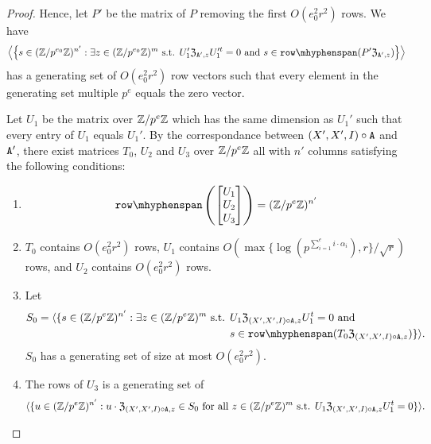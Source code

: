 \begin{proof}
Hence, let $P'$ be the matrix of $P$ removing the first $O(e_0^2 r^2)$ rows. 
We have \[\left\langle \left\{ s \in (\Z / p^{e_0}\Z)^{n'} : \exists z \in (\Z / p^{e_0} \Z)^m \text{ s.t. } U_{1}' \mathfrak{Z}_{\tA', z} U_{1}'^t = 0 \text{ and } s \in \rowspan(P'  \mathfrak{Z}_{\tA', z}) \right\} \right\rangle\] has a generating set of $O(e_0^2 r^2)$ row vectors such that every element in the generating set multiple $p^e$ equals the zero vector. 


Let $U_{1}$ be the matrix over $\mathbb{Z} / p^e \mathbb{Z}$ which has the same dimension as $U_{1}'$ such that every entry of $U_{1}$ equals $U_{1}'$.
By the correspondance between $(X', X', I) \circ \mathtt{A}$ and $\mathtt{A}'$,  
there exist matrices $T_0$,
$U_{2}$ and $U_3$ over $\mathbb{Z} / p^e \mathbb{Z}$ all with $n'$ columns satisfying the following conditions:
\begin{enumerate}
\item \[\rowspan\left(\begin{bmatrix} U_{1} \\ U_{2} \\ U_3 \end{bmatrix}\right) = (\Z /  p^e \Z)^{n'}\]
\item $T_0$ contains $O(e_0^2 r^2)$ rows, $U_1$ contains $O(\max\{\log(p^{\sum_{i = 1}^{e} i \cdot \alpha_i}), r\} / \sqrt{r})$ rows, and $U_2$ contains $O(e_0^2 r^2)$ rows. 
\item 
Let 
\[\begin{split}S_0 = \langle \{s \in (\Z / p^{e}\Z)^{n'} : \exists  z \in (\Z / p^{e}\Z)^m \text{ s.t. }& U_1 \mathfrak{Z}_{(X', X', I) \circ \tA, z} U_1^t = 0 \text{ and } \\ & s \in \rowspan(T_0 \mathfrak{Z}_{(X', X', I) \circ \tA, z})\}\rangle.\end{split}\]
$S_0$ has a generating set of size at most $O(e_0^2 r^2)$.
\item 
The rows of $U_3$ is a generating set of 
\[\begin{split} \langle \{u \in (\Z / p^e \Z)^{n'} : %
u \cdot \mathfrak{Z}_{(X', X', I) \circ \tA, z} \in S_0  \text{ for all } 
z \in (\Z / p^e \Z)^m \text{ s.t. }  U_1 \mathfrak{Z}_{(X', X', I) \circ \tA, z} U_1^t = 0 \}\rangle.\end{split}\]
\end{enumerate}



\end{proof}
